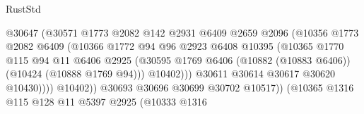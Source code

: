 \begin{lexlean}{RustStd}
\begin{coremodule}
                                          @30647
                                          (@30571
                                            @1773
                                            @2082
                                            @142
                                            @2931
                                            @6409
                                            @2659
                                            @2096
                                            (@10356
                                              @1773
                                              @2082
                                              @6409
                                              (@10366
                                                @1772
                                                @94
                                                @96
                                                @2923
                                                @6408
                                                @10395
                                                (@10365
                                                  @1770
                                                  @115
                                                  @94
                                                  @11
                                                  @6406
                                                  @2925
                                                  (@30595
                                                    @1769
                                                    @6406
                                                    (@10882 (@10883 @6406))
                                                    (@10424 (@10888 @1769 @94)))
                                                  @10402)))
                                            @30611
                                            @30614
                                            @30617
                                            @30620
                                            @10430))))
                                    @10402))
                                @30693
                                @30696
                                @30699
                                @30702
                                @10517))
                            (@10365
                              @1316
                              @115
                              @128
                              @11
                              @5397
                              @2925
                              (@10333
                                @1316

\end{coremodule}
\end{lexlean}
